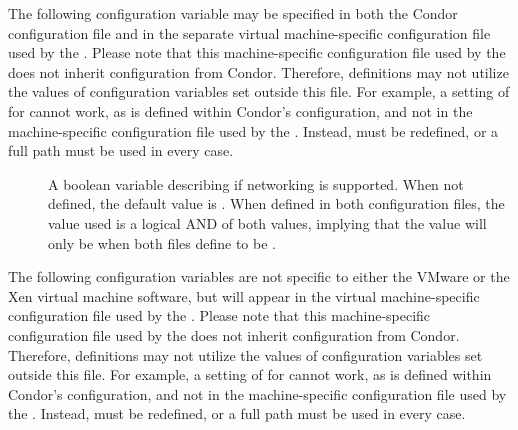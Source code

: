 The following configuration variable may be specified in both
the Condor configuration file and in the separate
virtual machine-specific configuration file used by the .
Please note that this machine-specific configuration file 
used by the  does not inherit configuration
from Condor.  Therefore, definitions may not utilize the values
of configuration variables set outside this file.
For example,
a setting of  for
 cannot work,
as  is defined within Condor's configuration,
and not in the machine-specific configuration file
used by the .
Instead,  must be redefined,
or a full path must be used in every case.

\begin{description}
\item[]
  \label{param:VMNetworking}
  A boolean variable describing if networking is supported.
  When not defined, the default value is .
  When defined in both configuration files,
  the value used is a logical AND of both values,
  implying that the value will only be  when
  both files define  to be .
\end{description}

The following configuration variables are not specific to either the VMware
or the Xen virtual machine software, but will appear in the
virtual machine-specific configuration file used by the .
Please note that this machine-specific configuration file 
used by the  does not inherit configuration
from Condor.  Therefore, definitions may not utilize the values
of configuration variables set outside this file.
For example,
a setting of  for
 cannot work,
as  is defined within Condor's configuration,
and not in the machine-specific configuration file
used by the .
Instead,  must be redefined,
or a full path must be used in every case.

